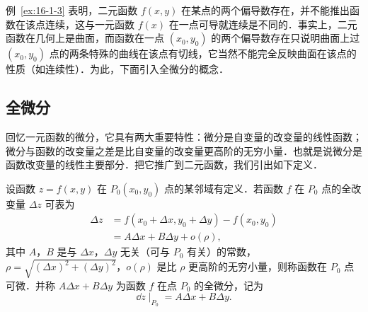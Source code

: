 \begin{figure}[htbp]
\centering
{}\caption{\relax}\label{fig:16-2}
\end{figure}

例~\ref{ex:16-1-3} 表明，二元函数 $f(x,y)$ 在某点的两个偏导数存在，并不能推出函数在该点连续，这与一元函数 $f(x)$ 在一点可导就连续是不同的．事实上，二元函数在几何上是曲面，而函数在一点 $(x_{0},y_{0})$ 的两个偏导数存在只说明曲面上过 $(x_{0},y_{0})$ 点的两条特殊的曲线在该点有切线，它当然不能完全反映曲面在该点的性质（如连续性）．为此，下面引入全微分的概念．

\subsection{全微分}

回忆一元函数的微分，它具有两大重要特性：微分是自变量的改变量的线性函数；微分与函数的改变量之差是比自变量的改变量更高阶的无穷小量．也就是说微分是函数改变量的线性主要部分．把它推广到二元函数，我们引出如下定义．

\begin{definition}\label{def:16-2}
设函数 $z=f(x,y)$ 在 $P_{0}(x_{0},y_{0})$ 点的某邻域有定义．若函数 $f$ 在 $P_{0}$ 点的全改变量 $\Delta z$ 可表为
\begin{equation}
\begin{aligned}
\Delta z&=f(x_{0}+\Delta x,y_{0}+\Delta y)-f(x_{0},y_{0})\\
&=A\Delta x+B\Delta y+o(\rho),
\end{aligned}
\tag{1}
\end{equation}
其中 $A$，$B$ 是与 $\Delta x$，$\Delta y$ 无关（可与 $P_{0}$ 有关）的常数，$\rho=\sqrt{(\Delta x)^{2}+(\Delta y)^{2}}$，$o(\rho)$ 是比 $\rho$ 更高阶的无穷小量，则称函数在 $P_{0}$ 点可微．并称 $A\Delta x+B\Delta y$ 为函数 $f$ 在点 $P_{0}$ 的全微分，记为
\[
\dd z\mid_{P_{0}}=A\Delta x+B\Delta y.
\]
\end{definition}

